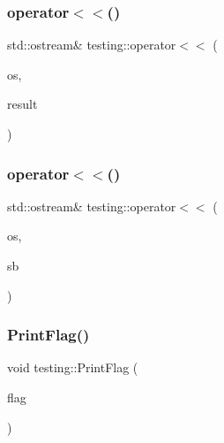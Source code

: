 \mbox{\label{namespacetesting_a266e39b7c4691fedb856047673a412d8}} 
\subsubsection{\texorpdfstring{operator$<$$<$()}{operator<<()}\hspace{0.1cm}{\footnotesize\ttfamily [1/2]}}
{\footnotesize\ttfamily std\+::ostream\& testing\+::operator$<$$<$ (\begin{DoxyParamCaption}\item[{std\+::ostream \&}]{os,  }\item[{const Test\+Part\+Result \&}]{result }\end{DoxyParamCaption})}

\mbox{\label{namespacetesting_a7b802e532fd68749765cb7dc156130db}} 
\subsubsection{\texorpdfstring{operator$<$$<$()}{operator<<()}\hspace{0.1cm}{\footnotesize\ttfamily [2/2]}}
{\footnotesize\ttfamily std\+::ostream\& testing\+::operator$<$$<$ (\begin{DoxyParamCaption}\item[{std\+::ostream \&}]{os,  }\item[{const \mbox{\hyperlink{classtesting_1_1Message}{Message}} \&}]{sb }\end{DoxyParamCaption})\hspace{0.3cm}{\ttfamily [inline]}}

\mbox{\label{namespacetesting_a9863402455bfcf9be5fc0b1453a6d97d}} 
\subsubsection{\texorpdfstring{PrintFlag()}{PrintFlag()}}
{\footnotesize\ttfamily void testing\+::\+Print\+Flag (\begin{DoxyParamCaption}\item[{const char $\ast$}]{flag }\end{DoxyParamCaption})}

